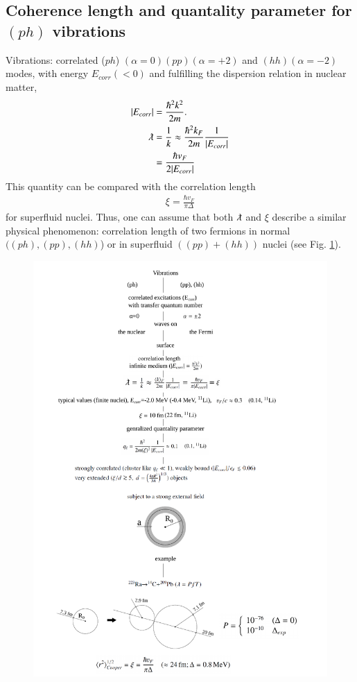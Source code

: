 \begin{subappendices}
 \subsection{Coherence length and quantality parameter for $(ph)$ vibrations}
 Vibrations: correlated ($ph$) $(\alpha=0) (pp) (\alpha=+2)$ and $(hh)(\alpha=-2)$ modes, with energy $E_{corr}(<0)$ and fulfilling the dispersion relation in nuclear matter,
 \begin{align}
 \nonumber|E_{corr}|&=\frac{\hbar^2k^2}{2m}.\\
 \nonumber\lambdabar&=\frac{1}{k}\approx \frac{\hbar^2k_F}{2m}\frac{1}{|E_{corr}|}\\
 &=\frac{\hbar v_F}{2|E_{corr}|}
 \end{align}  
 This quantity can be compared with the correlation length
 \begin{align}
 \xi=\frac{\hbar v_F}{\pi\Delta}
 \end{align} 
 for superfluid nuclei. Thus, one can assume that both $\lambdabar$ and $\xi$ describe a similar  physical phenomenon: correlation length of two fermions in normal $((ph),(pp),(hh)$) or in superfluid $((pp)+(hh))$ nuclei (see Fig. \ref{fig3B3x}).
       \begin{figure}
       	\centerline{\includegraphics*[width=17cm,angle=0	]{nutshell/figs/fig3B3x}}
       	\caption{}\label{fig3B3x}
       \end{figure}

\end{subappendices}
